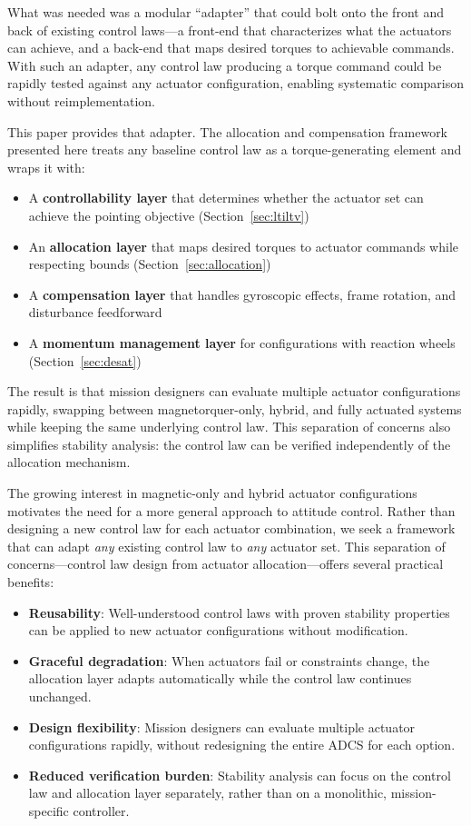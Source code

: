 \documentclass[conference]{IEEEtran}
\begin{document}
What was needed was a modular ``adapter'' that could bolt onto the front and back of existing control laws---a front-end that characterizes what the actuators can achieve, and a back-end that maps desired torques to achievable commands. With such an adapter, any control law producing a torque command could be rapidly tested against any actuator configuration, enabling systematic comparison without reimplementation.

This paper provides that adapter. The allocation and compensation framework presented here treats any baseline control law as a torque-generating element and wraps it with:
\begin{itemize}
    \item A \textbf{controllability layer} that determines whether the actuator set can achieve the pointing objective (Section~\ref{sec:ltiltv})
    \item An \textbf{allocation layer} that maps desired torques to actuator commands while respecting bounds (Section~\ref{sec:allocation})
    \item A \textbf{compensation layer} that handles gyroscopic effects, frame rotation, and disturbance feedforward
    \item A \textbf{momentum management layer} for configurations with reaction wheels (Section~\ref{sec:desat})
\end{itemize}

The result is that mission designers can evaluate multiple actuator configurations rapidly, swapping between magnetorquer-only, hybrid, and fully actuated systems while keeping the same underlying control law. This separation of concerns also simplifies stability analysis: the control law can be verified independently of the allocation mechanism.

The growing interest in magnetic-only and hybrid actuator configurations motivates the need for a more general approach to attitude control. Rather than designing a new control law for each actuator combination, we seek a framework that can adapt \emph{any} existing control law to \emph{any} actuator set. This separation of concerns---control law design from actuator allocation---offers several practical benefits:
\begin{itemize}
    \item \textbf{Reusability}: Well-understood control laws with proven stability properties can be applied to new actuator configurations without modification.
    \item \textbf{Graceful degradation}: When actuators fail or constraints change, the allocation layer adapts automatically while the control law continues unchanged.
    \item \textbf{Design flexibility}: Mission designers can evaluate multiple actuator configurations rapidly, without redesigning the entire ADCS for each option.
    \item \textbf{Reduced verification burden}: Stability analysis can focus on the control law and allocation layer separately, rather than on a monolithic, mission-specific controller.
\end{itemize}
\end{document}
